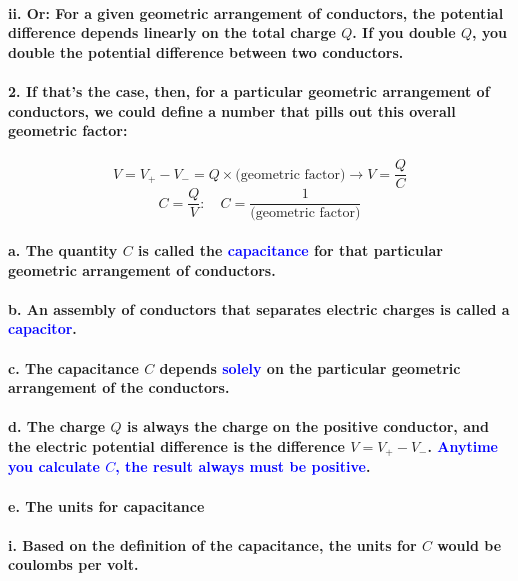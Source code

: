 \documentclass{article}
\begin{document}
\paragraph{\indent\indent ii. Or: For a given geometric arrangement of conductors, the potential difference depends linearly on the total charge $Q$. If you double $Q$, you double the potential difference between two conductors.}
\paragraph{2. If that's the case, then, for a particular geometric arrangement of conductors, we could define a number that pills out this overall geometric factor:}
\begin{equation*}
    V=V_+-V_-=Q\times \text{(geometric factor)}\rightarrow V=\frac{Q}{C}
\end{equation*}
\begin{equation*}
    C=\frac{Q}{V}:\quad C=\frac{1}{\text{(geometric factor)}}
\end{equation*}
\paragraph{\indent a. The quantity $C$ is called the \textcolor{blue}{capacitance} for that particular geometric arrangement of conductors.}
\paragraph{\indent b. An assembly of conductors that separates electric charges is called a \textcolor{blue}{capacitor}.}
\paragraph{\indent c. The capacitance $C$ depends \textcolor{blue}{solely} on the particular geometric arrangement of the conductors.}
\paragraph{\indent d. The charge $Q$ is always the charge on the positive conductor, and the electric potential difference is the difference $V=V_+-V_-$. \textcolor{blue}{Anytime you calculate $C$, the result always must be positive}.}
\paragraph{\indent e. The units for capacitance}
\paragraph{\indent\indent i. Based on the definition of the capacitance, the units for $C$ would be coulombs per volt.}
\end{document}
